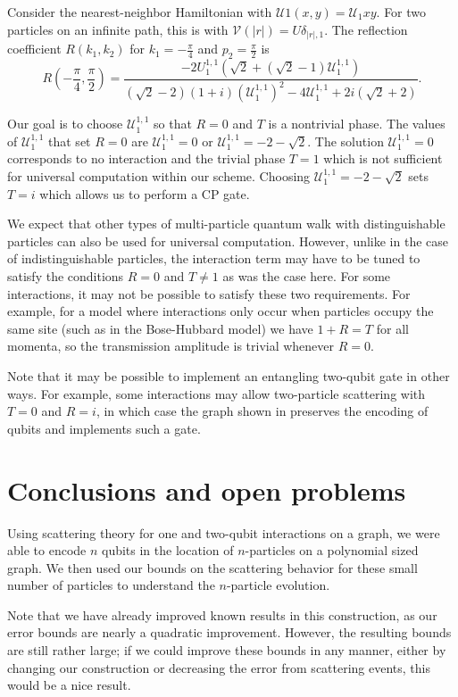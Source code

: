 \documentclass[../thesis-main/thesis-main]{subfiles}
\begin{document}
Consider the nearest-neighbor Hamiltonian with $\mathcal{U}{1}(x,y) = \mathcal{U}_{1}xy$. For two particles on an infinite path, this is  with $\mathcal{V}(|r|)=U\delta_{|r|,1}$. The reflection coefficient $R(k_1,k_2)$  for $k_1=-\frac{\pi}{4}$ and $p_2 = \frac{\pi}{2}$ is
\[
  R\left(-\frac{\pi}{4},\frac{\pi}{2}\right) =\frac{-2U_{1}^{1,1}\left(\sqrt{2}+(\sqrt{2}-1)\mathcal{U}_{1}^{1,1}\right)}{(\sqrt{2} - 2)(1+i) (\mathcal{U}_{1}^{1,1})^2 - 4 \mathcal{U}_{1}^{1,1} + 2 i (\sqrt{2} + 2)}.
\]

Our goal is to choose $\mathcal{U}_{1}^{1,1}$ so that $R=0$ and $T$ is a nontrivial phase. The values of $\mathcal{U}_{1}^{1,1}$ that set $R=0$ are  $\mathcal{U}_{1}^{1,1} = 0$ or $\mathcal{U}_{1}^{1,1} = -2 - \sqrt{2}$.  The solution $\mathcal{U}_{1}^{1,1} = 0$ corresponds to no interaction and the trivial phase $T = 1$ which is not sufficient for universal computation within our scheme. Choosing $\mathcal{U}_{1}^{1,1}=-2-\sqrt{2}$ sets $T= i$ which allows us to perform a CP gate. 

We expect that other types of multi-particle quantum walk with distinguishable particles can also be used for universal computation. However, unlike in the case of indistinguishable particles, the interaction term may have to be tuned to satisfy the conditions $R=0$ and $T\neq1$  as was the case here.  For some interactions, it may not be possible to satisfy these two requirements.  For example, for a model where interactions only occur when particles occupy the same site (such as in the Bose-Hubbard model) we have $1+R = T$ for all momenta, so the transmission amplitude is trivial whenever $R=0$.

Note that it may be possible to implement an entangling two-qubit gate in other ways.  For example, some interactions may allow two-particle scattering with $T=0$ and $R=i$, in which case the graph shown in  preserves the encoding of qubits and implements such a gate.

\section{Conclusions and open problems}

Using scattering theory for one and two-qubit interactions on a graph, we were able to encode $n$ qubits in the location of $n$-particles on a polynomial sized graph.  We then used our bounds on the scattering behavior for these small number of particles to understand the $n$-particle evolution.  

Note that we have already improved known results in this construction, as our error bounds are nearly a quadratic improvement.  However, the resulting bounds are still rather large; if we could improve these bounds in any manner, either by changing our construction or decreasing the error from scattering events, this would be a nice result.

\biblio{}
\end{document}
